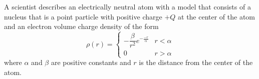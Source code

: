 \documentclass{../../../oss-apphys-exam}
\begin{document}
\begin{questions}
  \newpage

  
  \question A scientist describes an electrically neutral atom with a model
  that consists of a nucleus that is a point particle with positive charge $+Q$
  at the center of the atom and an electron volume charge density of the form
  \begin{displaymath}
    \rho(r)=
    \begin{cases}
      -\dfrac\beta{r^2}e^{-\frac{-r}\alpha} & r<\alpha\\
      0          & r>\alpha
      \end{cases}
  \end{displaymath}
  where $\alpha$ and $\beta$ are positive constants and $r$ is the distance
  from the center of the atom.
  
  \begin{parts}

\end{parts}
\end{questions}
\end{document}
